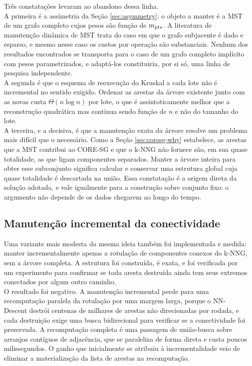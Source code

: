 Três constatações levaram ao abandono dessa linha.\\

A primeira é a assimetria da Seção \ref{sec:asymmetry}: o objeto a manter é a \ac{MST} de um grafo completo cujos pesos são função de $m_{pts}$. A literatura de manutenção dinâmica de \ac{MST} \cite{mst_maintenance} trata do caso em que o grafo subjacente é dado e esparso, e mesmo nesse caso os custos por operação são substanciais. Nenhum dos resultados encontrados se transporta para o caso de um grafo completo implícito com pesos parametrizados, e adaptá-los constituiria, por si só, uma linha de pesquisa independente.\\

A segunda é que o esquema de reexecução do Kruskal a cada lote não é incremental no sentido exigido. Ordenar as arestas da árvore existente junto com as novas custa $\Theta(n \log n)$ por lote, o que é assintoticamente melhor que a reconstrução quadrática mas continua sendo função de $n$ e não do tamanho do lote.\\

A terceira, e a decisiva, é que a manutenção exata da árvore resolve um problema mais difícil que o necessário. Como a Seção \ref{sec:coresg-why} estabelece, as arestas que a \ac{MST} contribui ao \ac{CORE-SG} e que o \ac{k-NNG} não fornece são, em sua quase totalidade, as que ligam componentes separados. Manter a árvore inteira para obter esse subconjunto significa calcular e conservar uma estrutura global cuja quase totalidade é descartada na união. Essa constatação é a origem direta da solução adotada, e vale igualmente para a construção sobre conjunto fixo: o argumento não depende de os dados chegarem ao longo do tempo.\\

\subsection{Manutenção incremental da conectividade\label{sec:discarded-connectivity}}

Uma variante mais modesta da mesma ideia também foi implementada e medida: manter incrementalmente apenas a rotulação de componentes conexos do \ac{k-NNG}, sem a árvore completa. A estrutura foi construída, é exata, e foi verificada por um experimento para confirmar se toda aresta destruída ainda tem seus extremos conectados por algum outro caminho.\\

O resultado foi negativo. A manutenção incremental perde para uma recomputação paralela da rotulação por uma margem larga, porque o NN-Descent destrói centenas de milhares de arestas não direcionadas por rodada, e cada destruição exige uma busca bidirecional para verificar se a conectividade foi preservada. A recomputação completa é uma passagem de união-busca sobre arranjos contíguos de adjacência, que se paraleliza de forma direta e custa poucos milissegundos. O ganho que inicialmente se atribuiu à incrementalidade veio de eliminar a materialização da lista de arestas na recomputação.\\

